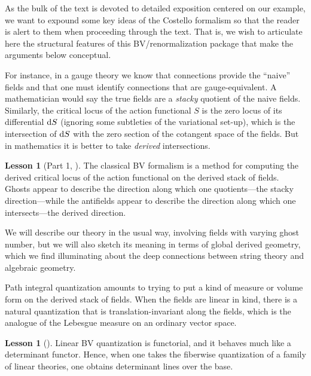 As the bulk of the text is devoted to detailed exposition centered on our example,
we want to expound some key ideas of the Costello formalism so that the reader is alert to them when proceeding through the text.
That is, we wish to articulate here the structural features of this BV/renormalization package that make the arguments below conceptual.

\theoremstyle{definition}
\newtheorem{lesson}[thm]{Lesson}

For instance, in a gauge theory we know that connections provide the ``naive'' fields and that one must identify connections that are gauge-equivalent.
A mathematician would say the true fields are a {\em stacky} quotient of the naive fields.
Similarly, the critical locus of the action functional $S$ is the zero locus of its differential ${\rm d} S$ (ignoring some subtleties of the variational set-up),
which is the intersection of ${\rm d} S$ with the zero section of the cotangent space of the fields.
But in mathematics it is better to take {\em derived} intersections.

\begin{lesson}[Part 1, \cite{CG2}]
The classical BV formalism is a method for computing the derived critical locus of the action functional on the derived stack of fields.
Ghosts appear to describe the direction along which one quotients---the stacky direction---while the antifields appear to describe the direction along which one intersects---the derived direction.
\end{lesson}

We will describe our theory in the usual way, involving fields with varying ghost number, 
but we will also sketch its meaning in terms of global derived geometry,
which we find illuminating about the deep connections between string theory and algebraic geometry.

Path integral quantization amounts to trying to put a kind of measure or volume form on the derived stack of fields.
When the fields are linear in kind, 
there is a natural quantization that is translation-invariant along the fields,
which is the analogue of the Lebesgue measure on an ordinary vector space.

\begin{lesson}[\cite{GH}]
Linear BV quantization is functorial, and it behaves much like a determinant functor.
Hence, when one takes the fiberwise quantization of a family of linear theories,
one obtains determinant lines over the base.
\end{lesson}

